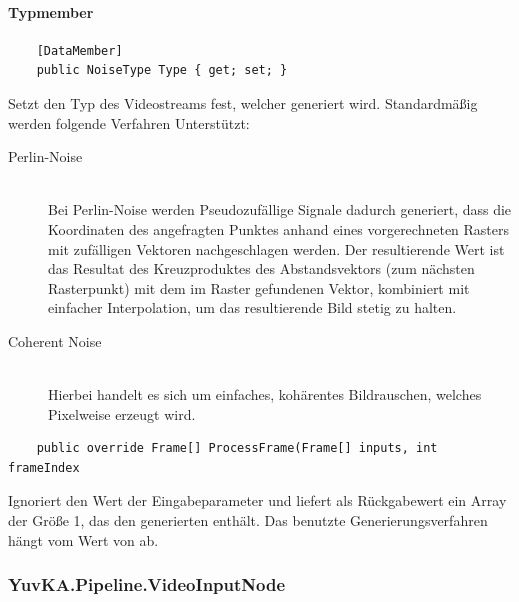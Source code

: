 \paragraph{Typmember}
\begin{itemize}

	\begin{verbatim}
	[DataMember]
	public NoiseType Type { get; set; }
	\end{verbatim}
	Setzt den Typ des Videostreams fest, welcher generiert wird. Standardmäßig werden folgende Verfahren Unterstützt:
	\begin{description}
		\item[Perlin-Noise]~\\
		Bei Perlin-Noise werden Pseudozufällige Signale dadurch generiert, dass die Koordinaten des angefragten Punktes anhand eines vorgerechneten Rasters mit zufälligen Vektoren nachgeschlagen werden. Der resultierende Wert ist das Resultat des Kreuzproduktes des Abstandsvektors (zum nächsten Rasterpunkt) mit dem im Raster gefundenen Vektor, kombiniert mit einfacher Interpolation, um das resultierende Bild stetig zu halten.
		\item[Coherent Noise]~\\
		Hierbei handelt es sich um einfaches, kohärentes Bildrauschen, welches Pixelweise erzeugt wird.
	\end{description}

	\begin{verbatim}
	public override Frame[] ProcessFrame(Frame[] inputs, int frameIndex
	\end{verbatim}
	Ignoriert den Wert der Eingabeparameter und liefert als Rückgabewert ein Array der Größe 1, das den generierten  enthält. Das benutzte Generierungsverfahren hängt vom Wert von  ab.


\end{itemize}

\subsubsection{YuvKA.Pipeline.VideoInputNode}
